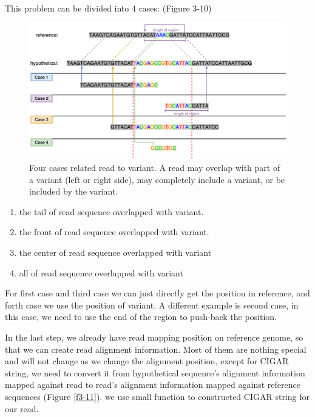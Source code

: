 \begin{flushleft}
This problem can be divided into 4 cases: (Figure 3-10)
\end{flushleft}
\begin{figure}[H]
    \centering
    \includegraphics[width=1\columnwidth]{body/image/3-10.png}
    \captionsetup{labelfont=bf}
    \renewcommand{\baselinestretch}{1.0}
    \vspace{-1cm}
    \caption[alignment read]{Four cases related read to variant.  A read may overlap with part of a variant (left or right side), may completely include a variant, or be included by the variant.}
    \label{f3-10}
\end{figure}

\begin{enumerate}
    \item the tail of read sequence overlapped with variant.
    \item the front of read sequence overlapped with variant.
    \item the center of read sequence overlapped with variant
    \item all of read sequence overlapped with variant
\end{enumerate}

For first case and third case we can just directly get the position in reference, and forth case we use the position of variant. A different example is second case, in this case, we need to use the end of the region to push-back the position.

In the last step, we already have read mapping position on reference genome, so that we can create read alignment information. Most of them are nothing special and will not change as we change the alignment position, except for CIGAR string, we need to convert it from hypothetical sequence's alignment information mapped against read to read's alignment information mapped against reference sequences (Figure \ref{f3-11}). we use small function to constructed CIGAR string for our read.

